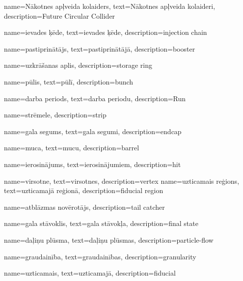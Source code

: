 {
        name=Nākotnes apļveida kolaiders,
        text=Nākotnes apļveida kolaideri,
        description={Future Circular Collider}
}

{
        name=ievades ķēde,
        text=ievades ķēde,
        description={injection chain}
}

{
        name=pastiprinātājs,
        text=pastiprinātājā,
        description={booster}
}

{
        name=uzkrāšanas aplis,
        description={storage ring}
}

{
        name=pūlis,
        text=pūlī,
        description={bunch}
}

{
        name=darba periods,
        text=darba periodu,
        description={Run}
}

{
        name=strēmele,
        description={strip}
}

{
        name=gala segums,
        text=gala segumi,
        description={endcap}
}

{
        name=muca,
        text=mucu,
        description={barrel}
}

{
        name=ierosinājums,
        text=ierosinājumiem,
        description={hit}
}

{
        name=virsotne,
        text=virsotnes,
        description={vertex}
}
{
        name=uzticamais reģions,
        text=uzticamajā reģionā,
        description={fiducial region}
}

{
        name=atblāzmas novērotājs,
        description={tail catcher}
}


{
        name=gala stāvoklis,
        text=gala stāvokļa,
        description={final state}
}

{
        name=daļiņu plūsma,
        text=daļiņu plūsmas,
        description={particle-flow}
}

{
        name=graudainība,
        text=graudainības,
        description={granularity}
}

{
        name=uzticamais,
        text=uzticamajā,
        description={fiducial}
}


